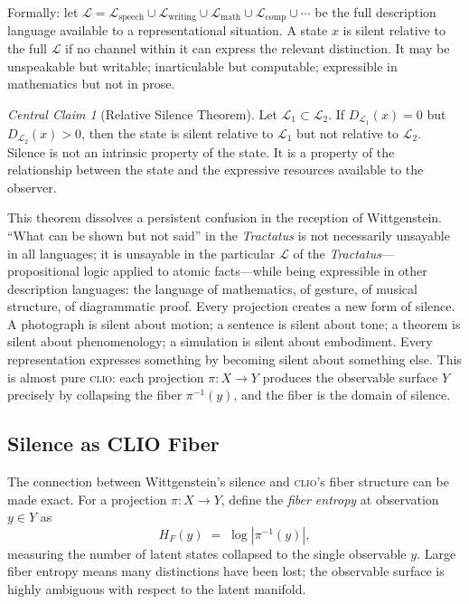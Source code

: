 \documentclass[12pt, letterpaper]{article}
\theoremstyle{remark}
\newtheorem*{claim}{Central Claim}
\newcommand{\clio}{\textsc{clio}}
\begin{document}
Formally: let $\mathcal{L} = \mathcal{L}_{\mathrm{speech}} \cup
\mathcal{L}_{\mathrm{writing}} \cup \mathcal{L}_{\mathrm{math}} \cup
\mathcal{L}_{\mathrm{comp}} \cup \cdots$ be the full description language
available to a representational situation.  A state $x$ is silent relative
to the full $\mathcal{L}$ if no channel within it can express the relevant
distinction.  It may be unspeakable but writable; inarticulable but
computable; expressible in mathematics but not in prose.

\begin{claim}[Relative Silence Theorem]
Let $\mathcal{L}_1 \subset \mathcal{L}_2$.  If
$D_{\mathcal{L}_1}(x) = 0$ but $D_{\mathcal{L}_2}(x) > 0$, then the
state is silent relative to $\mathcal{L}_1$ but not relative to
$\mathcal{L}_2$.  Silence is not an intrinsic property of the state.
It is a property of the relationship between the state and the expressive
resources available to the observer.
\end{claim}

This theorem dissolves a persistent confusion in the reception of
Wittgenstein.  ``What can be shown but not said'' in the \textit{Tractatus}
is not necessarily unsayable in all languages; it is unsayable in the
particular $\mathcal{L}$ of the \textit{Tractatus}---propositional logic
applied to atomic facts---while being expressible in other description
languages: the language of mathematics, of gesture, of musical structure,
of diagrammatic proof.  Every projection creates a new form of silence.
A photograph is silent about motion; a sentence is silent about tone; a
theorem is silent about phenomenology; a simulation is silent about
embodiment.  Every representation expresses something by becoming silent
about something else.  This is almost pure \clio{}: each projection
$\pi: X \to Y$ produces the observable surface $Y$ precisely by collapsing
the fiber $\pi^{-1}(y)$, and the fiber is the domain of silence.

\subsection{Silence as CLIO Fiber}

The connection between Wittgenstein's silence and \clio{}'s fiber structure
can be made exact.  For a projection $\pi: X \to Y$, define the
\emph{fiber entropy} at observation $y \in Y$ as
\begin{equation}
  H_F(y) \;=\; \log |\pi^{-1}(y)|,
\end{equation}
measuring the number of latent states collapsed to the single observable
$y$.  Large fiber entropy means many distinctions have been lost; the
observable surface is highly ambiguous with respect to the latent manifold.
\end{document}
